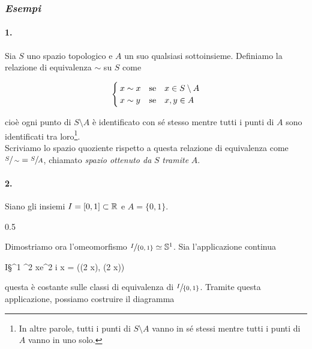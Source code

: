 \subsubsection{\textit{Esempi}}

\paragraph{1.}

Sia $ S $ uno spazio topologico e $ A $ un suo qualsiasi sottoinsieme. Definiamo la relazione di equivalenza $ \sim $ su $ S $ come

\begin{equation}
	\begin{cases}
		x \sim x & \qq*{se} x \in S \setminus A\\
		x \sim y & \qq*{se} x,y \in A
	\end{cases}
\end{equation}

cioè ogni punto di $ S \setminus A $ è identificato con sé stesso mentre tutti i punti di $ A $ sono identificati tra loro\footnote{%
	In altre parole, tutti i punti di $ S \setminus A $ vanno in sé stessi mentre tutti i punti di $ A $ vanno in uno solo.%
}.\\
Scriviamo lo spazio quoziente rispetto a questa relazione di equivalenza come $ \sfrac{S}{\sim} = \sfrac{S}{A} $, chiamato \textit{spazio ottenuto da} $ S $ \textit{tramite} $ A $.

\paragraph{2.}

Siano gli insiemi $ I = [0,1] \subset \mathbb{R} $ e $ A = \{0,1\} $. 

	{0.5}{%
			}
		
Dimostriamo ora l'omeomorfismo $ \sfrac{I}{\{0,1\}} \simeq \mathbb{S}^{1} $. Sia l'applicazione continua

%
	{I}{\S^{1} \subset \R^{2}}%
	{x}{e^{2 i \pi x} = (\cos(2 \pi x), \sin(2 \pi x))}

questa è costante sulle classi di equivalenza di $ \sfrac{I}{\{0,1\}} $. Tramite questa applicazione, possiamo costruire il diagramma

